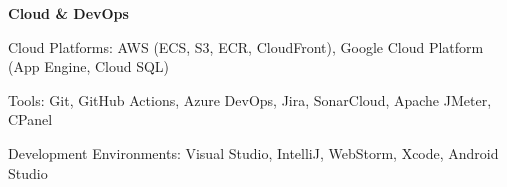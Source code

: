 \textbf{Cloud \& DevOps}
\begin{subitems}
    \item Cloud Platforms: AWS (ECS, S3, ECR, CloudFront), Google Cloud Platform (App Engine, Cloud SQL)
    \item Tools: Git, GitHub Actions, Azure DevOps, Jira, SonarCloud, Apache JMeter, CPanel
    \item Development Environments: Visual Studio, IntelliJ, WebStorm, Xcode, Android Studio
\end{subitems}

